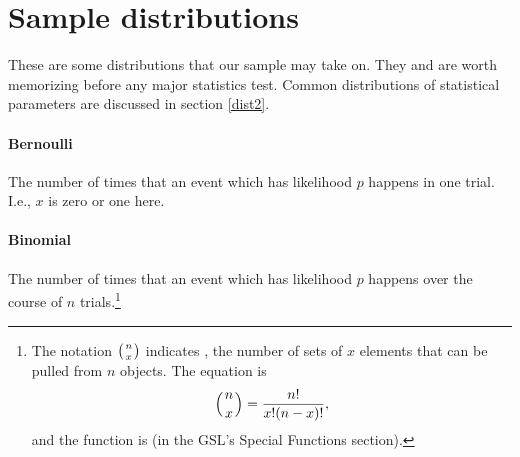 \section{Sample distributions}
\label{distlist}

These are some distributions that our sample may take on. They
and are worth memorizing
before any major statistics test. Common distributions of statistical
parameters are discussed in section \ref{dist2}.

\paragraph{Bernoulli}

The number of times that an event which has likelihood $p$ happens in
one trial. I.e., $x$ is zero or one here.

\long{}

\long{}


\paragraph{Binomial}

The number of times that an event which has likelihood $p$ happens over the
course of $n$ trials.\footnote{The notation $\left({n\atop x}\right)$ indicates
, the number of sets of $x$ elements that can be
pulled from $n$ objects. The equation is $$\left({n\atop x}\right) =
{n!\over x!(n-x)!},$$ and the function is 
(in the GSL's Special Functions section).}


